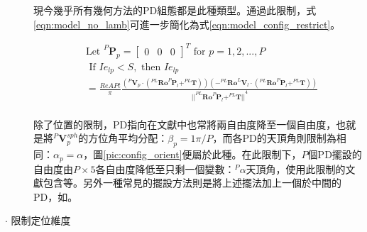 \begin{description}
        現今幾乎所有幾何方法的PD組態都是此種類型\cite{survey_light2018}。通過此限制，式\ref{eqn:model_no_lamb}可進一步簡化為式\ref{eqn:model_config_restrict}。

        \begin{equation}
            \label{eqn:model_config_restrict}
            \begin{aligned}
                &\text{Let }
                ^P\boldsymbol{P}_p=
                \left[\begin{array}{ccc}0&0&0\end{array}\right]^T
                \text{ for } p = 1,2,...,P\\
                &\text { If } Ie_{lp}<S ,\text{ then }Ie_{lp} \\
                    &= \frac{ReAPt}{ \pi}
                \frac{
                        {( ^{P}\boldsymbol{V}_p \cdot 
                            (
                                ^{PL} \boldsymbol{Ro}^{P}\boldsymbol{P}_l
                                + ^{PL}\boldsymbol{T}
                            )
                        )}
                {
                            (
                                -^{PL}\boldsymbol{Ro}^{L}\boldsymbol{V}_l 
                                \cdot 
                                (
                                    ^{PL}\boldsymbol{Ro}^{P}\boldsymbol{P}_l
                                    +^{PL}\boldsymbol{T}
                                )
                            )
                        } } 
                    {
                        {
                            ||
                                ^{PL}\boldsymbol{Ro}^{P}\boldsymbol{P}_l+^{PL}\boldsymbol{T}
                            ||
                        }^{4}
                    }\\
            \end{aligned}
        \end{equation}

        \qquad
        除了位置的限制，PD指向在文獻中也常將兩自由度降至一個自由度，也就是將$^P\boldsymbol{V}_p^{sph}$的方位角平均分配：$\beta_p = 1\pi/P$，而各PD的天頂角則限制為相同：$\alpha_p = \alpha$，圖\ref{pic:config_orient}便屬於此種。在此限制下，$P$個PD擺設的自由度由$P\times5$各自由度降低至只剩一個變數：$^P \alpha$天頂角，使用此限制的文獻包含\cite{case:cart2d}\cite{case:cart3d}\cite{case:3d_layers}等。另外一種常見的擺設方法則是將上述擺法加上一個於中間的PD，如\cite{case:ml}。

        \item[$\cdot$ 限制定位維度]\hfill
        

\end{description}
